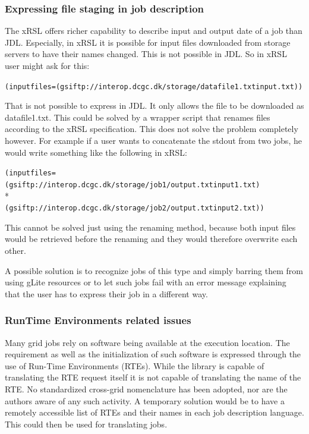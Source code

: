\documentclass{article}
\begin{document}
\subsubsection*{Expressing file staging in job description}
The xRSL offers richer capability to describe input and output date of a job than JDL. Especially, in xRSL it is possible for input files downloaded from storage servers to have their names changed. This is not possible in JDL. So in xRSL user might ask for this:
\begin{shaded}
\verb#(inputfiles=(gsiftp://interop.dcgc.dk/storage/datafile1.txtinput.txt))#
\end{shaded}
That is not possible to express in JDL. It only allows the file to be downloaded as datafile1.txt. This could be solved by a wrapper script that renames files according to the xRSL speciﬁcation. This does not solve the problem completely however. For example if a user wants to concatenate the stdout from two jobs, he would write something like the following in xRSL:
\begin{shaded}
\verb#(inputfiles=(gsiftp://interop.dcgc.dk/storage/job1/output.txtinput1.txt)#\\*
\verb#            (gsiftp://interop.dcgc.dk/storage/job2/output.txtinput2.txt))#
\end{shaded}
This cannot be solved just using the renaming method, because both input files would be retrieved before the renaming and they would therefore overwrite each other.\par
A possible  solution is to recognize jobs of this type and simply barring them from using gLite resources or to let such jobs fail with an error message explaining that the user has to express their job in a different way.
\subsubsection*{RunTime Environments related issues}
Many grid jobs rely on software being available at the execution location. The requirement as well as the initialization of such software is expressed through the use of Run-Time Environments (RTEs). While the library is capable of translating the RTE request itself it is not capable of translating the name of the RTE. No standardized cross-grid nomenclature has been adopted, nor are the authors aware of any such activity. A temporary solution would be to have a remotely accessible list of RTEs and their names in each job description language. This could then be used for translating jobs.
\appendix
\end{document}
